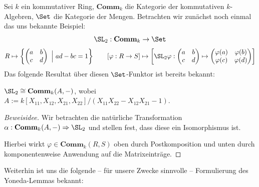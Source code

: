 \documentclass[11pt]{article}
\newcommand{\Comm}{\mathbf{Comm}}
\begin{document}
\noindent Sei $k$ ein kommutativer Ring, $\Comm_k$ die Kategorie der kommutativen $k$-Algebren, $\Set$ die Kategorie der Mengen.
Betrachten wir zunächst noch einmal das uns bekannte Beispiel:
$$\SL_2: \Comm_k \to \Set$$
$$R\mapsto \left\{\begin{pmatrix} a & b\\ c & d\end{pmatrix}\  \Big| \ ad-bc=1\right\} \qquad  [\varphi: R\to S]\mapsto \left[\SL_2\varphi: \begin{pmatrix} a & b\\ c & d\end{pmatrix}\mapsto \begin{pmatrix} \varphi(a) & \varphi(b)\\ \varphi(c) & \varphi(d)\end{pmatrix}\right]$$
Das folgende Resultat über diesen $\Set$-Funktor ist bereits bekannt:
\begin{theorem} \Theorem
    $\SL_2 \cong \Comm_k(A,-)$, wobei $A:= k[X_{11}, X_{12}, X_{21}, X_{22}]/(X_{11}X_{22} - X_{12}X_{21} - 1)$.
\end{theorem} 
\begin{proof}[Beweisidee] Wir betrachten die natürliche Transformation $\alpha: \Comm_k(A,-) \Rightarrow \SL_2$ und stellen fest, dass diese ein Isomorphismus ist.
    
    \begin{figure}[h]
        \centering
    \end{figure}
Hierbei wirkt $\varphi\in\Comm_k(R,S)$ oben durch Postkomposition und unten durch komponentenweise Anwendung auf die Matrixeinträge.
\end{proof}


Weiterhin ist uns die folgende -- für unsere Zwecke sinnvolle -- Formulierung des Yoneda-Lemmas bekannt:
\end{document}
